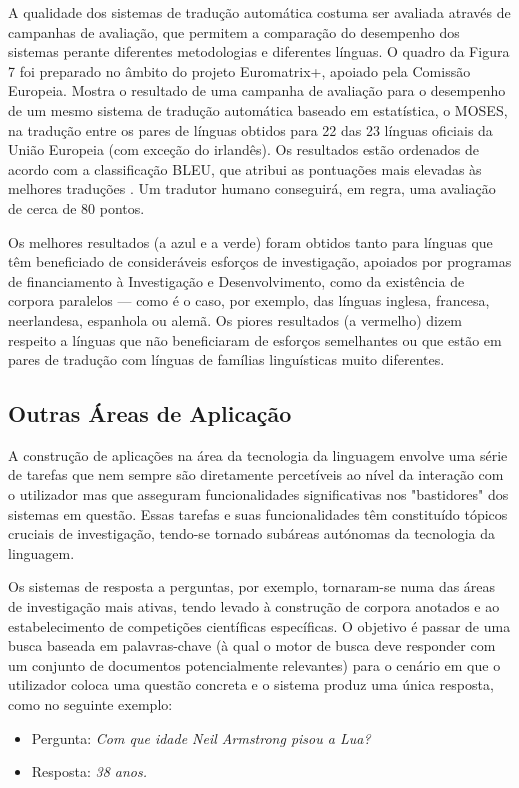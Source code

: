 \begin{multicols}{2}
A qualidade dos sistemas de tradução automática costuma ser avaliada através de campanhas de avaliação, que permitem 
a comparação do desempenho dos sistemas perante diferentes metodologias e diferentes línguas. 
O quadro da Figura 7 foi preparado no âmbito do projeto Euromatrix+, apoiado pela Comissão Europeia.
Mostra o resultado de uma campanha de avaliação para o desempenho de um mesmo sistema
de tradução automática baseado em estatística, o MOSES, na tradução entre 
os pares de línguas obtidos para 22 das 23 línguas oficiais da União Europeia (com exceção do irlandês).
Os resultados estão ordenados de acordo com a classificação BLEU, que atribui as pontuações mais elevadas às melhores traduções \cite{bleu1}.  
Um tradutor humano conseguirá, em regra, uma avaliação de cerca de 80 pontos.

Os melhores resultados (a azul e a verde) foram obtidos tanto para línguas que têm beneficiado de consideráveis esforços de investigação,
apoiados por programas de financiamento à Investigação e Desenvolvimento, como da existência de corpora paralelos ---
como é o caso, por exemplo, das línguas inglesa, francesa, neerlandesa, espanhola ou alemã. 
Os piores resultados (a vermelho) dizem respeito a línguas que não beneficiaram de esforços semelhantes 
ou que estão em pares de tradução com línguas de famílias linguísticas muito diferentes.



\subsection{Outras Áreas de Aplicação}

A construção de aplicações na área da tecnologia da linguagem envolve uma série de tarefas que nem sempre são 
diretamente percetíveis ao nível da interação com o utilizador
mas que asseguram funcionalidades significativas 
nos "bastidores" dos sistemas em questão. 
Essas tarefas e suas funcionalidades têm constituído tópicos cruciais de investigação, tendo-se tornado 
subáreas autónomas da tecnologia da linguagem.\\ %


Os sistemas de resposta a perguntas, por exemplo, tornaram-se numa das áreas de investigação mais ativas, 
tendo levado à construção de corpora anotados e ao estabelecimento de competições
científicas específicas. O objetivo é passar de uma busca baseada em palavras-chave 
(à qual o motor de busca deve responder com um conjunto de do\-cu\-men\-tos potencialmente relevantes) 
para o cenário em que o utilizador coloca uma questão concreta e o sistema produz uma única resposta,
como no seguinte exemplo:
\begin{itemize}
  \item[] Pergunta: \textit{Com que idade Neil Armstrong pisou a Lua?}
  \item[] Resposta: \textit{38 anos.}
\end{itemize}



\end{multicols}
